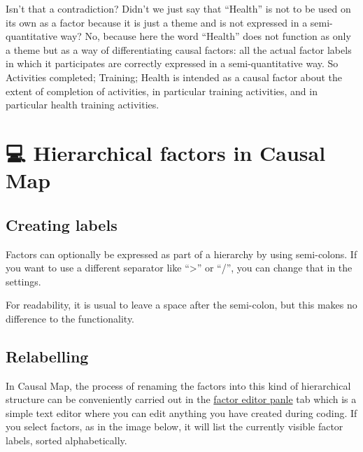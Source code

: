 \documentclass[
]{book}
\begin{document}
Isn't that a contradiction? Didn't we just say that ``Health'' is not to be used on its own as a factor because it is just a theme and is not expressed in a semi-quantitative way? No, because here the word ``Health'' does not function as only a theme but as a way of differentiating causal factors: all the actual factor labels in which it participates are correctly expressed in a semi-quantitative way. So Activities completed; Training; Health is intended as a causal factor about the extent of completion of activities, in particular training activities, and in particular health training activities.

\hypertarget{xhierarchical-coding}{%
\chapter{💻 Hierarchical factors in Causal Map}\label{xhierarchical-coding}}

\hypertarget{creating-labels}{%
\section{Creating labels}\label{creating-labels}}

Factors can optionally be expressed as part of a hierarchy by using semi-colons. If you want to use a different separator like ``\textgreater{}'' or ``/'', you can change that in the settings.

For readability, it is usual to leave a space after the semi-colon, but this makes no difference to the functionality.

\hypertarget{relabelling}{%
\section{Relabelling}\label{relabelling}}

In Causal Map, the process of renaming the factors into this kind of hierarchical structure can be conveniently carried out in the \protect\hyperlink{xfactor-editor}{factor editor panle} tab which is a simple text editor where you can edit anything you have created during coding. If you select factors, as in the image below, it will list the currently visible factor labels, sorted alphabetically.
\end{document}
